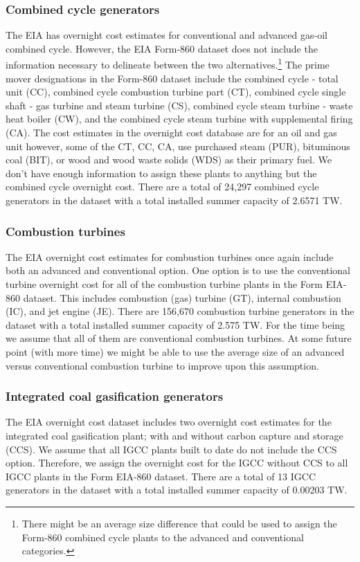 \documentclass[10pt]{amsart}
\begin{document}
\subsubsection{Combined cycle generators}
The EIA has overnight cost estimates for conventional and advanced gas-oil combined cycle.
However, the EIA Form-860 dataset does not include the information necessary to delineate between the two alternatives.\footnote{There might be an average size difference that could be used to assign the Form-860 combined cycle plants to the advanced and conventional categories.}
The prime mover designations in the Form-860 dataset include the combined cycle - total unit (CC), combined cycle combustion turbine part (CT), combined cycle single shaft - gas turbine and steam turbine (CS), combined cycle steam turbine - waste heat boiler (CW), and the combined cycle steam turbine with supplemental firing (CA). 
The cost estimates in the overnight cost database are for an oil and gas unit however, some of the CT, CC, CA, use purchased steam (PUR), bituminous coal (BIT), or wood and wood waste solids (WDS) as their primary fuel.  
We don't have enough information to assign these plants to anything but the combined cycle overnight cost. 
There are a total of 24,297 combined cycle generators in the dataset with a total installed summer capacity of 2.6571 TW. 

\subsubsection{Combustion turbines}
The EIA overnight cost estimates for combustion turbines once again include both an advanced and conventional option. 
One option is to use the conventional turbine overnight cost for all of the combustion turbine plants in the Form EIA-860 dataset. 
This includes combustion (gas) turbine (GT), internal combustion (IC), and jet engine (JE).
There are 156,670 combustion turbine generators in the dataset with a total installed summer capacity of  2.575 TW. 
For the time being we assume that all of them are conventional combustion turbines. 
At some future point (with more time) we might be able to use the average size of an advanced versus conventional combustion turbine to improve upon this assumption. 

\subsubsection{Integrated coal gasification generators}
The EIA overnight cost dataset includes two overnight cost estimates for the integrated coal gasification plant; with and without carbon capture and storage (CCS). 
We assume that all IGCC plants built to date do not include the CCS option. 
Therefore, we assign the overnight cost for the IGCC without CCS to all IGCC plants in the Form EIA-860 dataset. 
There are a total of 13 IGCC generators in the dataset with a total installed summer capacity of 0.00203 TW. 
\end{document}
